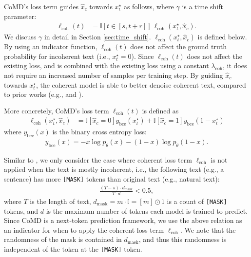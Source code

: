 CoMD's loss term guides $\hat x_c$ towards $x^\star_t$ as follows, where $\gamma$ is a time shift parameter:
\begin{align}
\label{eq:coherent_loss_def_definition}
    \ell_\mathrm{coh}(t) &= \mathbb I[t \in [s,t+r]] \,\ell_{\mathrm{coh}}(x^\star_t, \hat x_c).
\end{align}
We discuss $\gamma$ in detail in Section \ref{sec:time_shift}. $\ell_\mathrm{coh}(x^\star_t,\hat x_c)$ is defined below. By using an indicator function, $\ell_\mathrm{coh}(t)$ does not affect the ground truth probability for incoherent text (i.e., $x^\star_t=0$). Since $\ell_\mathrm{coh}(t)$ does not affect the existing loss, and is combined with the existing loss using a constant $\lambda_\mathrm{coh}$, it does not require an increased number of samples per training step. By guiding $\hat x_c$ towards $x^\star_t$, the coherent model is able to better denoise coherent text, compared to prior works (e.g., \citet{austin2023structured} and \citet{shih2022training}).

More concretely, CoMD's loss term $\ell_\mathrm{coh}(t)$ is defined as
\begin{align}
    \ell_\mathrm{coh}(x^\star_t,\hat x_c) &= \mathbb I[\hat x_c=0] y_\mathrm{bce}(x^\star_t) + \mathbb I[\hat x_c=1] y_\mathrm{bce}(1-x^\star_t) \label{eq:coherent_loss}
\end{align}
where $y_\mathrm{bce}(x)$ is the binary cross entropy loss:
\begin{align}
    y_\mathrm{bce}(x) = - x \log p_\theta(x) - (1-x)\log p_\theta(1-x).
\end{align}

Similar to \citet{shih2025simplified}, we only consider the case where coherent loss term $\ell_\mathrm{coh}$ is not applied when the text is mostly incoherent, i.e., the following text (e.g., a sentence) has more \texttt{[MASK]} tokens than original text (e.g., natural text): 
\begin{align}
\label{eq:inv_bound}
    \frac{(T-s)\cdot d_\mathrm{mask}}{T\cdot d} < 0.5, 
\end{align}
where $T$ is the length of text, $d_\mathrm{mask}=m\cdot \mathbb I = [m] \odot 1$ is a count of \texttt{[MASK]} tokens, and $d$ is the maximum number of tokens each model is trained to predict. Since CoMD is a next-token prediction framework, we use the above relation as an indicator for when to apply the coherent loss term $\ell_\mathrm{coh}$. We note that the randomness of the mask is contained in $d_\mathrm{mask}$, and thus this randomness is independent of the token at the \texttt{[MASK]} token. 

